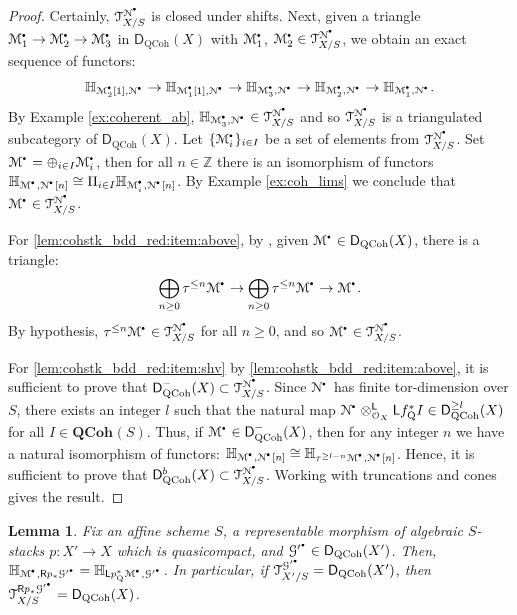 \documentclass{amsart}
\theoremstyle{plain}
\newtheorem{lem}[thm]{Lemma}
\theoremstyle{definition}
\theoremstyle{remark}
\numberwithin{equation}{section}
\newcommand{\itemref}[1]{\eqref{#1}}
\newcommand{\Z}{\mathbb{Z}}
\newcommand{\Orb}{\mathcal{O}}
\newcommand{\QCOHB}{\mathbf{QCoh}}
\newcommand{\QCOH}[2][]{\QCOHB^{#1}({#2})}
\newcommand{\trunc}[1]{\tau^{{#1}}}
\newcommand{\RDERF}{\mathsf{R}}
\newcommand{\LDERF}{\mathsf{L}}
\newcommand{\DCAT}{\mathsf{D}}
\newcommand{\tensor}{\otimes}
\newcommand{\shv}[1]{\mathcal{{#1}}}
\newcommand{\E}[2]{\mathbb{H}_{{#1},{#2}}}
\newcommand{\QCPBK}[1]{{#1}_{\mathrm{Q}}^*}
\newcommand{\DQCOH}{\DCAT_{\mathrm{QCoh}}}
\newcommand{\TSUB}[2]{\mathcal{T}_{{#1}}^{{#2}}}
\newcommand{\sbt}{\,\begin{picture}(-1,-1)(0,-2)\circle*{1.5}\end{picture}\ }
\newcommand{\cplx}[1]{\shv{{#1}}^{\sbt}}
\begin{document}
\begin{proof}
  Certainly, $\TSUB{X/S}{\cplx{N}}$ is closed under
  shifts. Next, given a triangle $\cplx{M}_1 \to \cplx{M}_2 \to
  \cplx{M}_3$ in $\DQCOH(X)$ with
  $\cplx{M}_1$, $\cplx{M}_2 \in \TSUB{X/S}{\cplx{N}}$, we
  obtain an exact sequence of functors:
  \[
  \E{\cplx{M}_2[1]}{\cplx{N}} \to
  \E{\cplx{M}_1[1]}{\cplx{N}} \to
  \E{\cplx{M}_3}{\cplx{N}} \to
  \E{\cplx{M}_2}{\cplx{N}} \to
  \E{\cplx{M}_1}{\cplx{N}}.
  \]
  By Example \ref{ex:coherent_ab},
  $\E{\cplx{M}_3}{\cplx{N}} \in
  \TSUB{X/S}{\cplx{N}}$ and so $\TSUB{X/S}{\cplx{N}}$ is
  a triangulated subcategory of $\DQCOH(X)$. Let
  $\{\cplx{M}_i\}_{i\in I}$ be a set of elements from $\TSUB{X/S}{\cplx{N}}$. Set $\cplx{M} =
  \oplus_{i\in I} 
  \cplx{M}_i$, then for all $n \in \Z$ there is an isomorphism
  of functors $\E{\cplx{M}}{\cplx{N}[n]} \cong \Pi_{i\in
    I}\E{\cplx{M}_i}{\cplx{N}[n]}$. By Example
  \ref{ex:coh_lims} we conclude that $\cplx{M} \in
  \TSUB{X/S}{\cplx{N}}$.

  For \itemref{lem:cohstk_bdd_red:item:above}, by
  \cite[Lem.~4.3.2]{MR2434692}, given $\cplx{M} \in
  \DQCOH(X)$, there is a triangle:
  \[
  \bigoplus_{n\geq 0} \trunc{\leq n}\cplx{M} \to \bigoplus_{n\geq 0}
  \trunc{\leq n} \cplx{M} \to \cplx{M}. 
  \]
  By hypothesis, $\trunc{\leq n}\cplx{M} \in
  \TSUB{X/S}{\cplx{N}}$ for all $n\geq 0$, and so
  $\cplx{M} \in \TSUB{X/S}{\cplx{N}}$.

  For \itemref{lem:cohstk_bdd_red:item:shv} by
  \itemref{lem:cohstk_bdd_red:item:above}, it is sufficient to prove that
  $\DQCOH^-(X) \subset \TSUB{X/S}{\cplx{N}}$. Since $\cplx{N}$ has
  finite tor-dimension over $S$, there exists an integer $l$ such that
  the natural map $\cplx{N} \tensor^\LDERF_{\Orb_X} \LDERF \QCPBK{f} I
  \in \DQCOH^{\geq l}(X)$ for all $I\in \QCOH{S}$. Thus, if $\cplx{M}
  \in \DQCOH^-(X)$, then for any integer $n$ we have a natural
  isomorphism of functors: $\E{\cplx{M}}{\cplx{N}[n]} \cong
  \E{\trunc{\geq l-n}\cplx{M}}{\cplx{N}[n]}$. Hence, it is sufficient
  to prove that $\DQCOH^b(X) \subset \TSUB{X/S}{\cplx{N}}$. Working
  with truncations and cones gives the result.
\end{proof}
\begin{lem}\label{lem:cohstk_maps}
  Fix an affine scheme $S$, a representable morphism of
  algebraic $S$-stacks $p : X'\to X$ which is quasicompact, and
  $\cplx{G'} \in 
  \DQCOH(X')$. Then, $\E{\cplx{M}}{\RDERF p_*\cplx{G'}} = \E{\LDERF
  \QCPBK{p}\cplx{M}}{\cplx{G'}}$. In
  particular, if $\TSUB{X'/S}{\cplx{G'}} =
  \DQCOH(X')$, then $\TSUB{X/S}{\RDERF
    p_*\cplx{G'}} = \DQCOH(X)$.
\end{lem}
\end{document}
